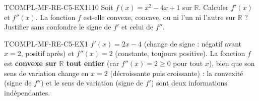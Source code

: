 

\begin{exercice}{TCOMPL-MF-RE-C5-EX1}{1}{10}
Soit $f(x) = x^2 - 4x + 1$ sur $\mathbb{R}$. Calculer $f'(x)$ et $f''(x)$. La fonction $f$ est-elle convexe, concave, ou ni l'un ni l'autre sur $\mathbb{R}$ ? Justifier sans confondre le signe de $f'$ et celui de $f''$.
\end{exercice}


\begin{corrige}{TCOMPL-MF-RE-C5-EX1}
$f'(x) = 2x-4$ (change de signe : négatif avant $x=2$, positif après) et $f''(x) = 2$ (constante, toujours positive). La fonction $f$ est \textbf{convexe sur $\mathbb{R}$ tout entier} (car $f''(x)=2 \geq 0$ pour tout $x$), bien que son sens de variation change en $x=2$ (décroissante puis croissante) : la convexité (signe de $f''$) et le sens de variation (signe de $f'$) sont deux informations indépendantes.
\end{corrige}
